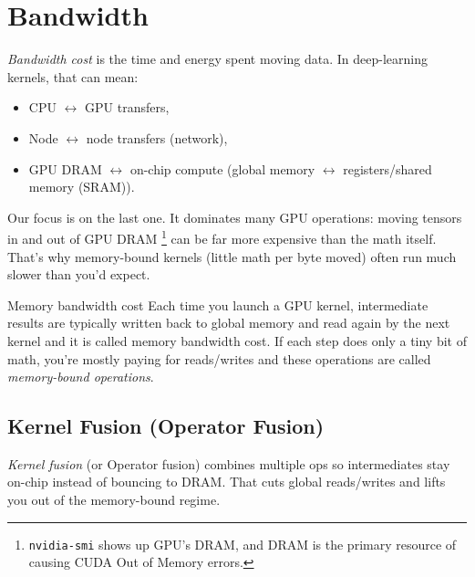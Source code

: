 \section{Bandwidth}

\textit{Bandwidth cost} is the time and energy spent moving data. In deep-learning kernels, that can mean:
\begin{itemize}
	\item CPU $\leftrightarrow$ GPU transfers,
	\item Node $\leftrightarrow$ node transfers (network),
	\item GPU DRAM $\leftrightarrow$ on-chip compute (global memory $\leftrightarrow$ registers/shared memory (SRAM)).
\end{itemize}
Our focus is on the last one. It dominates many GPU operations: moving tensors in and out of GPU DRAM \footnote{\texttt{nvidia-smi} shows up GPU's DRAM, and DRAM is the primary resource of causing CUDA Out of Memory errors.} can be far more expensive than the math itself. That's why memory-bound kernels (little math per byte moved) often run much slower than you'd expect.

\begin{commentbox}{Memory bandwidth cost}
	Each time you launch a GPU kernel, intermediate results are typically written back to global memory and read again by the next kernel and it is called memory bandwidth cost. If each step does only a tiny bit of math, you're mostly paying for reads/writes and these operations are called \textit{memory-bound operations}. 
\end{commentbox}

\subsection{Kernel Fusion (Operator Fusion)}

\textit{Kernel fusion} (or Operator fusion) combines multiple ops so intermediates stay on-chip instead of bouncing to DRAM. That cuts global reads/writes and lifts you out of the memory-bound regime.

